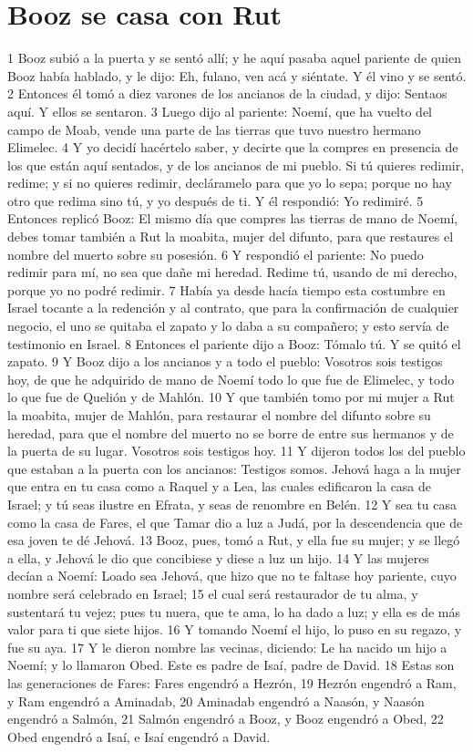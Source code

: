 \section*{Booz se casa con Rut}


1 Booz subió a la puerta y se sentó allí; y he aquí pasaba aquel pariente de quien Booz había hablado, y le dijo: Eh, fulano, ven acá y siéntate. Y él vino y se sentó.
2 Entonces él tomó a diez varones de los ancianos de la ciudad, y dijo: Sentaos aquí. Y ellos se sentaron.
3 Luego dijo al pariente: Noemí, que ha vuelto del campo de Moab, vende una parte de las tierras que tuvo nuestro hermano Elimelec.
4 Y yo decidí hacértelo saber, y decirte que la compres en presencia de los que están aquí sentados, y de los ancianos de mi pueblo. Si tú quieres redimir, redime; y si no quieres redimir, decláramelo para que yo lo sepa; porque no hay otro que redima sino tú, y yo después de ti. Y él respondió: Yo redimiré.
5 Entonces replicó Booz: El mismo día que compres las tierras de mano de Noemí, debes tomar también a Rut la moabita, mujer del difunto, para que restaures el nombre del muerto sobre su posesión.
6 Y respondió el pariente: No puedo redimir para mí, no sea que dañe mi heredad. Redime tú, usando de mi derecho, porque yo no podré redimir.
7 Había ya desde hacía tiempo esta costumbre en Israel tocante a la redención y al contrato, que para la confirmación de cualquier negocio, el uno se quitaba el zapato y lo daba a su compañero; y esto servía de testimonio en Israel.
8 Entonces el pariente dijo a Booz: Tómalo tú. Y se quitó el zapato. 
9 Y Booz dijo a los ancianos y a todo el pueblo: Vosotros sois testigos hoy, de que he adquirido de mano de Noemí todo lo que fue de Elimelec, y todo lo que fue de Quelión y de Mahlón.
10 Y que también tomo por mi mujer a Rut la moabita, mujer de Mahlón, para restaurar el nombre del difunto sobre su heredad, para que el nombre del muerto no se borre de entre sus hermanos y de la puerta de su lugar. Vosotros sois testigos hoy.
11 Y dijeron todos los del pueblo que estaban a la puerta con los ancianos: Testigos somos. Jehová haga a la mujer que entra en tu casa como a Raquel y a Lea, las cuales edificaron la casa de Israel; y tú seas ilustre en Efrata, y seas de renombre en Belén.
12 Y sea tu casa como la casa de Fares, el que Tamar dio a luz a Judá, por la descendencia que de esa joven te dé Jehová.
13 Booz, pues, tomó a Rut, y ella fue su mujer; y se llegó a ella, y Jehová le dio que concibiese y diese a luz un hijo.
14 Y las mujeres decían a Noemí: Loado sea Jehová, que hizo que no te faltase hoy pariente, cuyo nombre será celebrado en Israel;
15 el cual será restaurador de tu alma, y sustentará tu vejez; pues tu nuera, que te ama, lo ha dado a luz; y ella es de más valor para ti que siete hijos.
16 Y tomando Noemí el hijo, lo puso en su regazo, y fue su aya.
17 Y le dieron nombre las vecinas, diciendo: Le ha nacido un hijo a Noemí; y lo llamaron Obed. Este es padre de Isaí, padre de David.
18 Estas son las generaciones de Fares: Fares engendró a Hezrón,
19 Hezrón engendró a Ram, y Ram engendró a Aminadab,
20 Aminadab engendró a Naasón, y Naasón engendró a Salmón,
21 Salmón engendró a Booz, y Booz engendró a Obed,
22 Obed engendró a Isaí, e Isaí engendró a David.

